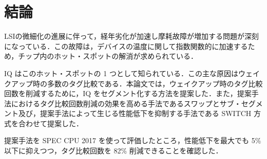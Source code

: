 
\chapter{結論}
\label{sec:summary}
LSIの微細化の進展に伴って，経年劣化が加速し摩耗故障が増加する問題が深刻になっている．この故障は，デバイスの温度に関して指数関数的に加速するため，チップ内のホット・スポットの解消が求められている．

IQ はこのホット・スポットの 1 つとして知られている．この主な原因はウェイクアップ時の多数のタグ比較である．本論文では，ウェイクアップ時のタグ比較回数を削減するために，IQ をセグメント化する方法を提案した．また，提案手法におけるタグ比較回数削減の効果を高める手法であるスワップとサブ・セグメント及び，提案手法によって生じる性能低下を抑制する手法である SWITCH 方式を合わせて提案した．

提案手法を SPEC CPU 2017 を使って評価したところ，性能低下を最大でも 5\% 以下に抑えつつ，タグ比較回数を 82\% 削減できることを確認した．

